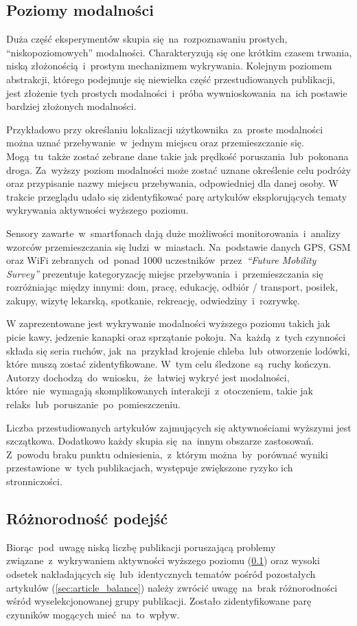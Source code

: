 \subsection{Poziomy modalności}
\label{sec:modality_levels}
Duża część eksperymentów skupia się~na~rozpoznawaniu prostych, ``niskopoziomowych'' modalności. Charakteryzują się one krótkim czasem trwania, niską złożonością~i~prostym mechanizmem wykrywania. Kolejnym poziomem abstrakcji, którego podejmuje się niewielka część przestudiowanych publikacji, jest złożenie tych prostych modalności~i~próba wywnioskowania~na~ich postawie bardziej złożonych modalności.

Przykładowo przy określaniu lokalizacji użytkownika~za~proste modalności można uznać przebywanie~w~jednym miejscu oraz przemieszczanie się. Mogą~tu~także zostać zebrane dane takie jak prędkość poruszania~lub~pokonana droga. Za~wyższy poziom modalności może zostać uznane określenie celu podróży oraz przypisanie nazwy miejscu przebywania, odpowiedniej dla danej osoby. W trakcie przeglądu udało się zidentyfikować parę artykułów eksplorujących tematy wykrywania aktywności wyższego poziomu.
\pagebreak

Sensory zawarte~w~smartfonach dają duże możliwości monitorowania~i~analizy wzorców przemieszczania się ludzi~w~miastach. Na~podstawie danych GPS, GSM oraz WiFi zebranych~od~ponad 1000 uczestników~przez~\textit{``Future Mobility Survey''} \cite{S26} prezentuje kategoryzację miejsc przebywania~i~przemieszczania się rozróżniając między innymi: dom, pracę, edukację, odbiór / transport, posiłek, zakupy, wizytę lekarską, spotkanie, rekreację, odwiedziny~i~rozrywkę.

W \cite{S38} zaprezentowane jest wykrywanie modalności wyższego poziomu takich jak picie kawy, jedzenie kanapki oraz sprzątanie pokoju. Na~każdą~z~tych czynności składa się seria ruchów, jak~na~przykład krojenie chleba~lub~otworzenie lodówki, które muszą zostać zidentyfikowane. W~tym celu śledzone~są~ruchy kończyn. Autorzy dochodzą~do~wniosku,~że~łatwiej wykryć jest modalności, które~nie~wymagają skomplikowanych interakcji~z~otoczeniem, takie jak relaks~lub~poruszanie~po~pomieszczeniu.

Liczba przestudiowanych artykułów zajmujących się aktywnościami wyższymi jest szczątkowa. Dodatkowo każdy skupia się~na~innym obszarze zastosowań. Z~powodu braku punktu odniesienia,~z~którym można~by~porównać wyniki przestawione~w~tych publikacjach, występuje zwiększone ryzyko ich stronniczości. 

\subsection{Różnorodność podejść}
Biorąc~pod~uwagę niską liczbę publikacji poruszającą problemy związane~z~wykrywaniem aktywności wyższego poziomu (\ref{sec:modality_levels}) oraz wysoki odsetek nakładających się~lub~identycznych tematów pośród pozostałych artykułów (\ref{sec:article_balance}) należy zwrócić uwagę~na~brak różnorodności wśród wyselekcjonowanej grupy publikacji. Zostało zidentyfikowane parę czynników mogących mieć~na~to~wpływ. 

